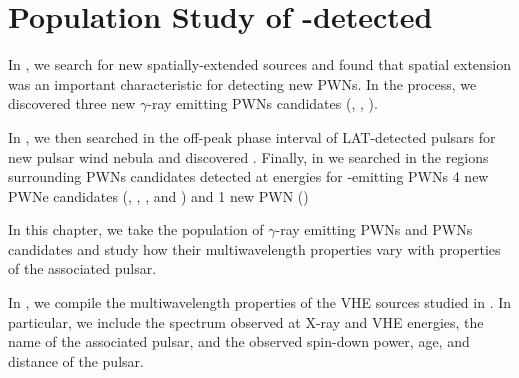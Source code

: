 \chapter{Population Study of -detected }


In , we search for new spatially-extended \fermi
sources and found that spatial extension was an important characteristic
for detecting new \acp{PWN}. In the process, we discovered three new
$\gamma$-ray emitting \acp{PWN} candidates (, ,
).

In , we then searched in the off-peak phase interval
of \ac{LAT}-detected pulsars for new pulsar wind nebula and discovered
\threecfiftyeight.  Finally, in  we searched in the
regions surrounding \acp{PWN} candidates detected at \tev energies for
\gev-emitting \acp{PWN} 4 new PWNe candidates (, ,
, and ) and 1 new PWN ()

In this chapter, we take the population of $\gamma$-ray emitting \acp{PWN}
and \acp{PWN} candidates and study how their multiwavelength properties
vary with properties of the associated pulsar.



In , we compile the multiwavelength
properties of the \ac{VHE} sources studied in . In
particular, we include the spectrum observed at X-ray and \ac{VHE}
energies, the name of the associated pulsar, and the observed spin-down
power, age, and distance of the pulsar.


